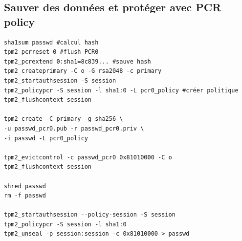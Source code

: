 \documentclass[resume]{subfiles}
\begin{document}
\subsection{Sauver des données et protéger avec PCR policy}
\begin{lstlisting}[style=bash]
sha1sum passwd #calcul hash
tpm2_pcrreset 0 #flush PCR0
tpm2_pcrextend 0:sha1=8c839... #sauve hash
tpm2_createprimary -C o -G rsa2048 -c primary
tpm2_startauthsession -S session
tpm2_policypcr -S session -l sha1:0 -L pcr0_policy #créer politique
tpm2_flushcontext session

tpm2_create -C primary -g sha256 \
-u passwd_pcr0.pub -r passwd_pcr0.priv \
-i passwd -L pcr0_policy

tpm2_evictcontrol -c passwd_pcr0 0x81010000 -C o
tpm2_flushcontext session

shred passwd
rm -f passwd

tpm2_startauthsession --policy-session -S session
tpm2_policypcr -S session -l sha1:0
tpm2_unseal -p session:session -c 0x81010000 > passwd
\end{lstlisting}
\end{document}
